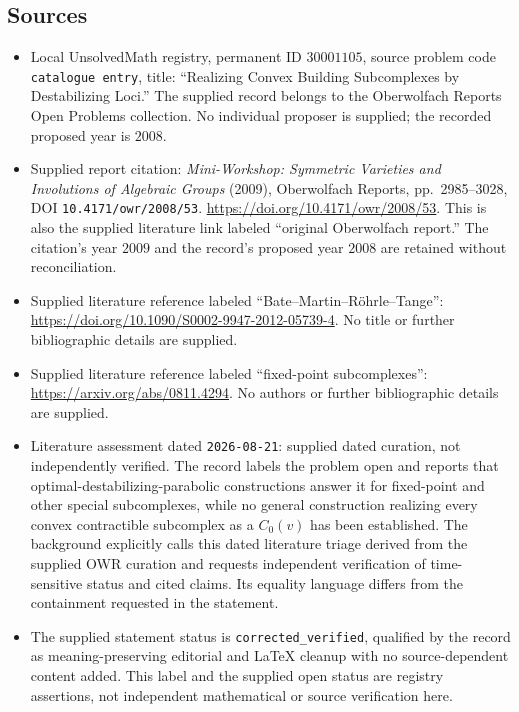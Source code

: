 \documentclass[11pt]{article}
\begin{document}
\subsection{Sources}
\begin{itemize}
\item Local UnsolvedMath registry, permanent ID \(30001105\), source problem code \texttt{catalogue entry}, title: ``Realizing Convex Building Subcomplexes by Destabilizing Loci.'' The supplied record belongs to the Oberwolfach Reports Open Problems collection. No individual proposer is supplied; the recorded proposed year is \(2008\).
\item Supplied report citation: \emph{Mini-Workshop: Symmetric Varieties and Involutions of Algebraic Groups} (2009), Oberwolfach Reports, pp.~2985--3028, DOI \texttt{10.4171/owr/2008/53}. \url{https://doi.org/10.4171/owr/2008/53}. This is also the supplied literature link labeled ``original Oberwolfach report.'' The citation's year \(2009\) and the record's proposed year \(2008\) are retained without reconciliation.
\item Supplied literature reference labeled ``Bate--Martin--R\"ohrle--Tange'': \url{https://doi.org/10.1090/S0002-9947-2012-05739-4}. No title or further bibliographic details are supplied.
\item Supplied literature reference labeled ``fixed-point subcomplexes'': \url{https://arxiv.org/abs/0811.4294}. No authors or further bibliographic details are supplied.
\item Literature assessment dated \texttt{2026-08-21}: supplied dated curation, not independently verified. The record labels the problem open and reports that optimal-destabilizing-parabolic constructions answer it for fixed-point and other special subcomplexes, while no general construction realizing every convex contractible subcomplex as a \(C_0(v)\) has been established. The background explicitly calls this dated literature triage derived from the supplied OWR curation and requests independent verification of time-sensitive status and cited claims. Its equality language differs from the containment requested in the statement.
\item The supplied statement status is \texttt{corrected\_verified}, qualified by the record as meaning-preserving editorial and LaTeX cleanup with no source-dependent content added. This label and the supplied open status are registry assertions, not independent mathematical or source verification here.
\end{itemize}
\end{document}
